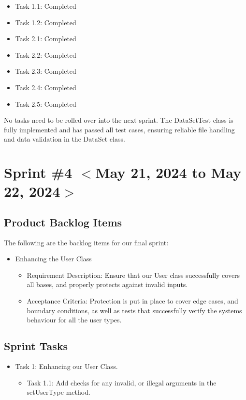 \documentclass{scrreprt}
\begin{document}
\begin{itemize}
    \item Task 1.1: Completed
    \item Task 1.2: Completed
    \item Task 2.1: Completed
    \item Task 2.2: Completed
    \item Task 2.3: Completed
    \item Task 2.4: Completed
    \item Task 2.5: Completed
\end{itemize}

No tasks need to be rolled over into the next sprint. The DataSetTest class is fully implemented and has passed all test cases, ensuring reliable file handling and data validation in the DataSet class.

% 
% 
\section{Sprint \#4 $<$May 21, 2024 to May 22, 2024$>$}

% 
\subsection{Product Backlog Items}

The following are the backlog items for our final sprint:

\begin{itemize}
    \item Enhancing the User Class
    \begin{itemize}
        \item Requirement Description: Ensure that our User class successfully covers all bases, and properly protects against invalid inputs.
        \item Acceptance Criteria: Protection is put in place to cover edge cases, and boundary conditions, as well as tests that successfully verify the systems behaviour for all the user types.
    \end{itemize}
\end{itemize}

% 
\subsection{Sprint Tasks}

\begin{itemize}
    \item Task 1: Enhancing our User Class.
    \begin{itemize}
        \item Task 1.1: Add checks for any invalid, or illegal arguments in the setUserType method.
    \end{itemize}
\end{itemize}
\end{document}
